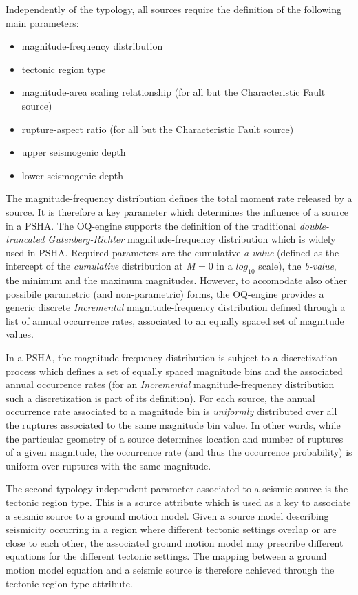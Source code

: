 Independently of the typology, all sources require the definition of the following main parameters:
\begin{itemize}
\item magnitude-frequency distribution
\item tectonic region type
\item magnitude-area scaling relationship (for all but the Characteristic Fault source)
\item rupture-aspect ratio (for all but the Characteristic Fault source)
\item upper seismogenic depth
\item lower seismogenic depth
\end{itemize}
The magnitude-frequency distribution defines the total moment rate released by a source. It is therefore a
key parameter which determines the influence of a source in a PSHA. The OQ-engine supports the definition
of the traditional \textit{double-truncated Gutenberg-Richter} magnitude-frequency distribution which is
widely used in PSHA. Required parameters are the cumulative \textit{a-value} (defined as the intercept
of the \textit{cumulative} distribution at $M=0$ in a $log_{10}$ scale), the \textit{b-value}, the minimum and
the maximum magnitudes. However, to accomodate also other possibile parametric (and non-parametric)
forms, the OQ-engine provides a generic discrete \textit{Incremental} magnitude-frequency distribution
defined through a list of annual occurrence rates, associated to an equally spaced set of magnitude values.

In a PSHA, the magnitude-frequency distribution is subject to a discretization process which defines a set
of equally spaced magnitude bins and the associated annual occurrence rates (for an \textit{Incremental}
magnitude-frequency distribution such a discretization is part of its definition). For each source, the annual
occurrence rate associated to a magnitude bin is \textit{uniformly} distributed over all the ruptures associated
to the same magnitude bin value. In other words, while the particular geometry of a source determines
location and number of ruptures of a given magnitude, the occurrence rate (and thus the occurrence
probability) is uniform over ruptures with the same magnitude.

The second typology-independent parameter associated to a seismic source is the tectonic region type.
This is a source attribute which is used as a key to associate a seismic source to a ground motion model.
Given a source model describing seismicity occurring in a region where different tectonic settings overlap or
are close to each other, the associated ground motion model may prescribe different equations for the different
tectonic settings. The mapping between a ground motion model equation and a seismic source is therefore
achieved through the tectonic region type attribute.


